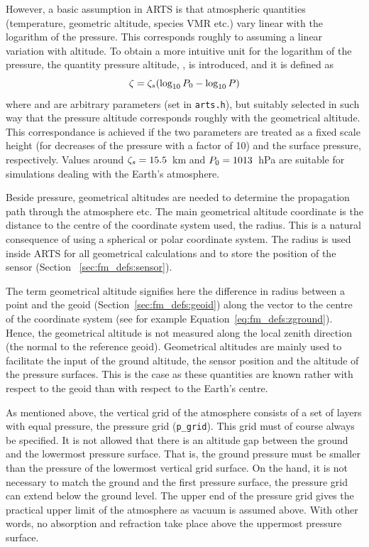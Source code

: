 However, a basic assumption in ARTS is that atmospheric quantities
(temperature, geometric altitude, species VMR etc.) vary linear with
the logarithm of the pressure. This corresponds roughly to assuming a
linear variation with altitude. To obtain a more intuitive unit for the
logarithm of the pressure, the quantity pressure altitude, \PrsAlt, is
introduced, and it is defined as
\begin{equation}
  \zeta = \zeta_{s}(\log_{10}P_{0} - \log_{10}P)
 \label{eq:fm_defs:prsalt}
\end{equation}
where  and  are arbitrary parameters (set in
\verb|arts.h|), but suitably selected in such way that the pressure
altitude corresponds roughly with the geometrical altitude.  This
correspondance is achieved if the two parameters are treated as a
fixed scale height (for decreases of the pressure with a factor of 10)
and the surface pressure, respectively. Values around
$\zeta_{s}=15.5$~km and $P_{0}=1013$~hPa are suitable for
simulations dealing with the Earth's atmosphere.

 Beside pressure, geometrical altitudes
are needed to determine the propagation path through the atmosphere
etc. The main geometrical altitude coordinate is the distance to the
centre of the coordinate system used, the radius. This is a natural
consequence of using a spherical or polar coordinate system. The
radius is used inside ARTS for all geometrical calculations and to
store the position of the sensor (Section~ \ref{sec:fm_defs:sensor}).

 The term
geometrical altitude signifies here the difference in radius between a
point and the geoid (Section~\ref{sec:fm_defs:geoid}) along the vector
to the centre of the coordinate system (see for example
Equation~\ref{eq:fm_defs:zground}). Hence, the geometrical altitude is
not measured along the local zenith direction (the normal to the
reference geoid). Geometrical altitudes are mainly used to
facilitate the input of the ground altitude, the sensor position and
the altitude of the pressure surfaces. This is the case as these
quantities are known rather with respect to the geoid than with
respect to the Earth's centre.


  
\label{sec:fm_defs:grids}

As mentioned above, the vertical grid of the atmosphere consists of a
set of layers with equal pressure, the pressure grid (\verb|p_grid|).
This grid must of course always be specified. It is not allowed that
there is an altitude gap between the ground and the lowermost pressure
surface.  That is, the ground pressure must be smaller than the
pressure of the lowermost vertical grid surface. On the hand, it is
not necessary to match the ground and the first pressure surface, the
pressure grid can extend below the ground level. The upper end of the
pressure grid gives the practical upper limit of the atmosphere as
vacuum is assumed above. With other words, no absorption and
refraction take place above the uppermost pressure surface.

